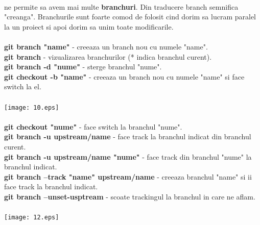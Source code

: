 ~\\
 ne permite sa avem mai multe \textbf{branchuri}.
Din traducere branch semnifica "creanga". Branchurile sunt foarte comod de folosit cind dorim sa lucram paralel la un proiect si apoi dorim sa unim toate modificarile.~\\
~\\
\textbf{git branch "name"} - creeaza un branch nou cu numele "name".~\\
\textbf{git branch} - vizualizarea branchurilor (* indica branchul curent).~\\
\textbf{git branch -d "nume"} - sterge branchul "nume".~\\
\textbf{git checkout -b "name"} - creeaza un branch nou cu numele "name" si
face switch la el.~\\
~\\
\texttt{[image: 10.eps]}~\\
\clearpage
~\\
\textbf{git checkout "nume"} - face switch la branchul "nume".~\\
\textbf{git branch -u upstream/name} - face track la branchul indicat din
branchul curent.~\\
\textbf{git branch -u upstream/name "nume" } - face track din branchul "nume"
la branchul indicat.~\\
\textbf{git branch --track "name" upstream/name} - creeaza branchul "name" si ii face track
la branchul indicat.~\\
\textbf{git branch --unset-usptream} - scoate trackingul la branchul in care ne
aflam.~\\
~\\
\texttt{[image: 12.eps]}~\\
~\\

